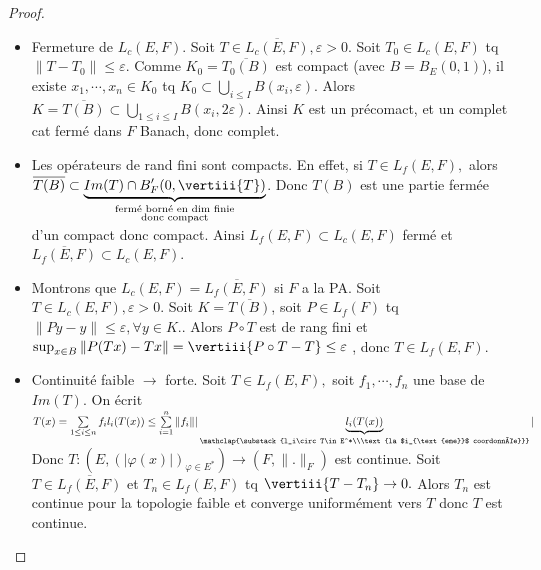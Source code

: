 \begin{proof}
    \begin{itemize}
        \item Fermeture de $L_c(E,F)$. Soit $T\in \overline{L_c(E,F)}, \varepsilon >0$. Soit $T_0\in L_c(E,F)$ tq $\|T-T_0\|\le \varepsilon .$ Comme $K_0=\overline{T_0(B)}$ est compact (avec $B=B_E(0,1)$), il existe $x_1,\cdots,x_n\in K_0$ tq $K_0\subset \bigcup\limits_{i\le  I}B(x_i,\varepsilon ).$ Alors $K=\overline{T(B)}\subset \bigcup\limits_{1\le i\le I} B(x_i,2\varepsilon )$. Ainsi $K$ est un précomact, et un complet cat fermé dans $F$ Banach, donc complet.
    \item Les opérateurs de rand fini sont compacts. En effet, si $T\in L_f(E,F),$ alors $\overline{T(B)}\subset \underbrace{Im(T)\cap B'_F(0, \vertiii{T})}_{\substack{\text{fermé borné en dim finie}\\\text{donc compact}}}$. Donc $T(B)$ est une partie fermée d'un compact donc compact. Ainsi $L_f(E,F)\subset L_c(E,F)$ fermé et $\overline{L_f(E,F)}\subset L_c(E,F)$.
    \item Montrons que $L_c(E,F)=\overline{L_f(E,F)}$ si $F$ a la PA. Soit $T\in L_c(E,F),\varepsilon >0.$ Soit $K=\overline{T(B)}$, soit $P\in L_f(F)$ tq $\|Py -y\|\le \varepsilon ,\forall y\in K.  $. Alors $P\circ T$ est de rang fini et $\sup_{x\in B}\|P(Tx)-Tx\|=\vertiii{P\circ T-T}\le \varepsilon $ , donc $T\in L_f(E,F).$
    \item Continuité faible $\to $ forte. Soit $T\in L_f(E,F),$ soit $f_1,\cdots,f_n$ une base de $Im(T).$ On écrit $T(x)=\sum\limits_{1\le i\le n}^{} f_il_i(T(x))\le \sum\limits_{i=1}^{n} \|f_i\||\underbrace{l_i(T(x))}_{\mathclap{\substack{l_i\circ T\in E^*\\\text{la $i_{\text{eme}}$ coordonnée}}}}| $ Donc $T:\left( E,\left( | \varphi (x)|  \right) _{\varphi \in E^*} \right) \to \left( F,\|.\|_F \right) $ est continue. Soit $T\in \overline{L_f(E,F)}$ et $T_n\in L_f(E,F)$ tq $\vertiii{T-T_n}\to 0.$ Alors $T_n$ est continue pour la topologie faible et converge uniformément vers $T$ donc $T$ est continue.
    \end{itemize}
\end{proof}
